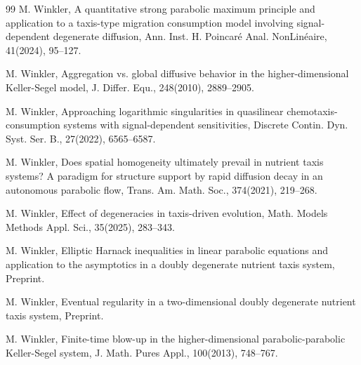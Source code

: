 \documentclass[12pt]{article}
\theoremstyle{plain}
\theoremstyle{definition}
\numberwithin{equation}{section}
\begin{document}
\begin{thebibliography}{99}
M. Winkler, A quantitative strong parabolic maximum principle and application to a taxis-type migration consumption model involving signal-dependent degenerate diffusion,
Ann. Inst. H. Poincar\'e Anal. NonLin\'eaire, 41(2024), 95--127.

 M. Winkler, Aggregation vs. global diffusive behavior in the higher-dimensional Keller-Segel model, J. Differ. Equ., 248(2010), 2889--2905.





 M. Winkler, Approaching logarithmic singularities in quasilinear chemotaxis-consumption systems with signal-dependent sensitivities, Discrete Contin. Dyn. Syst. Ser. B., 27(2022), 6565--6587.

 M. Winkler, Does spatial homogeneity ultimately prevail in nutrient taxis systems? A paradigm for structure support by rapid   diffusion decay in an autonomous parabolic flow, Trans. Am. Math. Soc., 374(2021), 219--268.

    M. Winkler, Effect of degeneracies in taxis-driven evolution,  Math. Models Methods Appl. Sci., 35(2025), 283--343.

 M. Winkler, Elliptic Harnack inequalities in linear parabolic equations and application to the asymptotics in a doubly degenerate nutrient taxis system, Preprint.

M. Winkler, Eventual regularity in a two-dimensional doubly degenerate nutrient taxis system, Preprint.

M. Winkler, Finite-time blow-up in the higher-dimensional parabolic-parabolic Keller-Segel system, J. Math. Pures Appl., 100(2013), 748--767.


\end{thebibliography}
\end{document}
